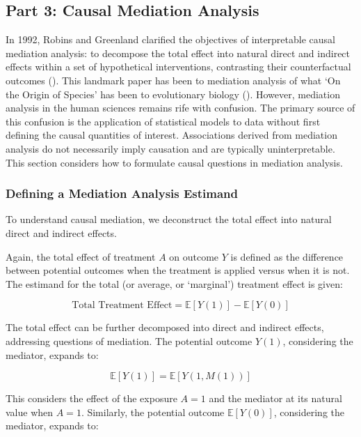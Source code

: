 \documentclass[
  single column]{article}
\begin{document}
\subsection{Part 3: Causal Mediation Analysis}\label{id-sec-3}

In 1992, Robins and Greenland clarified the objectives of interpretable
causal mediation analysis: to decompose the total effect into natural
direct and indirect effects within a set of hypothetical interventions,
contrasting their counterfactual outcomes
(). This landmark
paper has been to mediation analysis of what `On the Origin of Species'
has been to evolutionary biology
(). However, mediation
analysis in the human sciences remains rife with confusion. The primary
source of this confusion is the application of statistical models to
data without first defining the causal quantities of interest.
Associations derived from mediation analysis do not necessarily imply
causation and are typically uninterpretable. This section considers how
to formulate causal questions in mediation analysis.

\subsubsection{Defining a Mediation Analysis
Estimand}\label{defining-a-mediation-analysis-estimand}

To understand causal mediation, we deconstruct the total effect into
natural direct and indirect effects.

Again, the total effect of treatment \(A\) on outcome \(Y\) is defined
as the difference between potential outcomes when the treatment is
applied versus when it is not. The estimand for the total (or average,
or `marginal') treatment effect is given:

\[
\text{Total Treatment Effect} = \mathbb{E}[Y(1)] - \mathbb{E}[Y(0)]
\]

The total effect can be further decomposed into direct and indirect
effects, addressing questions of mediation. The potential outcome
\(Y(1)\), considering the mediator, expands to:

\[ 
\mathbb{E}[Y(1)] = \mathbb{E}[Y(1, M(1))]
\]

This considers the effect of the exposure \(A = 1\) and the mediator at
its natural value when \(A = 1\). Similarly, the potential outcome
\(\mathbb{E}[Y(0)]\), considering the mediator, expands to:
\end{document}
